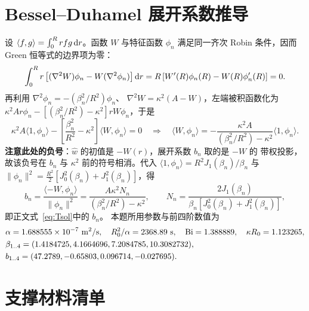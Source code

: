 \documentclass[bwprint]{cumcmthesis}
\begin{document}
\newpage
\appendix

\section{Bessel--Duhamel 展开系数推导}
\label{app:besselcoef}

设 $\langle f,g\rangle=\int_0^Rrfg\,{\rm d}r$。函数 $W$ 与特征函数
$\phi_n$ 满足同一齐次 Robin 条件，因而 Green 恒等式的边界项为零：
\[
\int_0^Rr\left[(\nabla^2W)\phi_n-W(\nabla^2\phi_n)\right]{\rm d}r
=R\left[W'(R)\phi_n(R)-W(R)\phi_n'(R)\right]=0.
\]
再利用
$\nabla^2\phi_n=-(\beta_n^2/R^2)\phi_n$、
$\nabla^2W=\kappa^2(A-W)$，左端被积函数化为
$\kappa^2Ar\phi_n-\left[(\beta_n^2/R^2)-\kappa^2\right]rW\phi_n$，于是
\[
\kappa^2A\langle1,\phi_n\rangle
-\left[\frac{\beta_n^2}{R^2}-\kappa^2\right]\langle W,\phi_n\rangle=0
\quad\Longrightarrow\quad
\langle W,\phi_n\rangle
=-\frac{\kappa^2A}{(\beta_n^2/R^2)-\kappa^2}\langle1,\phi_n\rangle .
\]
\textbf{注意此处的负号}：$\hat w$ 的初值是 $-W(r)$，展开系数 $b_n$ 取的是 $-W$ 的
带权投影，故该负号在 $b_n$ 与 $\kappa^2$ 前的符号相消。代入
$\langle1,\phi_n\rangle=R^2J_1(\beta_n)/\beta_n$ 与
$\|\phi_n\|^2=\frac{R^2}{2}\left[J_0^2(\beta_n)+J_1^2(\beta_n)\right]$，得
\begin{equation}
b_n=\frac{\langle -W,\phi_n\rangle}{\|\phi_n\|^2}
=\frac{A\kappa^2N_n}{(\beta_n^2/R^2)-\kappa^2},
\qquad
N_n=\frac{2J_1(\beta_n)}{\beta_n\left[J_0^2(\beta_n)+J_1^2(\beta_n)\right]},
\label{eq:bn}
\end{equation}
即正文式~\eqref{eq:Tsol}中的 $b_n$。
本题所用参数与前四阶数值为
\[
\begin{aligned}
&\alpha=1.688555\times10^{-7}\ {\rm m^2/s},\quad R_0^2/\alpha=2368.89\ {\rm s},\quad
\mathrm{Bi}=1.388889,\quad \kappa R_0=1.123265,\\
&\beta_{1..4}=(1.4184725,4.1664696,7.2084785,10.3082732),\\
&b_{1..4}=(47.2789,-0.65803,0.096714,-0.027695).
\end{aligned}
\]

\section{支撑材料清单}
\end{document}
